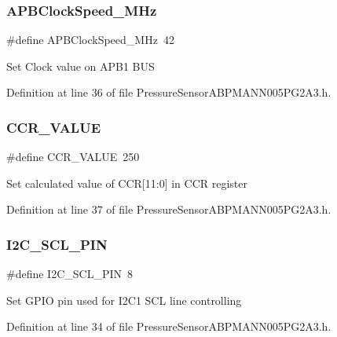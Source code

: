 \subsubsection{\texorpdfstring{APBClockSpeed\_MHz}{APBClockSpeed\_MHz}}
{\footnotesize\ttfamily \#define A\+P\+B\+Clock\+Speed\+\_\+\+M\+Hz~42}

Set Clock value on A\+P\+B1 B\+US 

Definition at line 36 of file Pressure\+Sensor\+A\+B\+P\+M\+A\+N\+N005\+P\+G2\+A3.\+h.

\mbox{\label{group___pressure_sensor_a_b_p_m_a_n_n005_p_g2_a3_ga7026c87335ace84ae881f34303b29aff_ga7026c87335ace84ae881f34303b29aff}} 
\subsubsection{\texorpdfstring{CCR\_VALUE}{CCR\_VALUE}}
{\footnotesize\ttfamily \#define C\+C\+R\+\_\+\+V\+A\+L\+UE~250}

Set calculated value of C\+CR\mbox{[}11\+:0\mbox{]} in C\+CR register 

Definition at line 37 of file Pressure\+Sensor\+A\+B\+P\+M\+A\+N\+N005\+P\+G2\+A3.\+h.

\mbox{\label{group___pressure_sensor_a_b_p_m_a_n_n005_p_g2_a3_ga0e4e08bab2fb484136d18b067bef372c_ga0e4e08bab2fb484136d18b067bef372c}} 
\subsubsection{\texorpdfstring{I2C\_SCL\_PIN}{I2C\_SCL\_PIN}}
{\footnotesize\ttfamily \#define I2\+C\+\_\+\+S\+C\+L\+\_\+\+P\+IN~8}

Set G\+P\+IO pin used for I2\+C1 S\+CL line controlling 

Definition at line 34 of file Pressure\+Sensor\+A\+B\+P\+M\+A\+N\+N005\+P\+G2\+A3.\+h.

